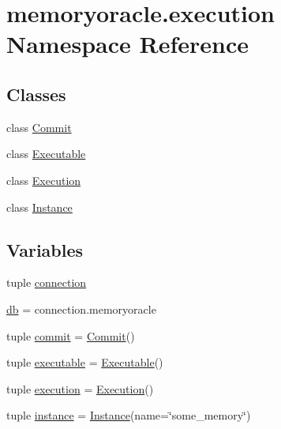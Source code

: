 \hypertarget{namespacememoryoracle_1_1execution}{}\section{memoryoracle.\+execution Namespace Reference}
\label{namespacememoryoracle_1_1execution}
\subsection*{Classes}
\begin{DoxyCompactItemize}
\item 
class \hyperlink{classmemoryoracle_1_1execution_1_1Commit}{Commit}
\item 
class \hyperlink{classmemoryoracle_1_1execution_1_1Executable}{Executable}
\item 
class \hyperlink{classmemoryoracle_1_1execution_1_1Execution}{Execution}
\item 
class \hyperlink{classmemoryoracle_1_1execution_1_1Instance}{Instance}
\end{DoxyCompactItemize}
\subsection*{Variables}
\begin{DoxyCompactItemize}
\item 
tuple \hyperlink{namespacememoryoracle_1_1execution_a784a8c4d93752cd7436bde333f52572f}{connection}
\item 
\hyperlink{namespacememoryoracle_1_1execution_ad0c5f80d3b0eb57b11ab6ab2a235858f}{db} = connection.\+memoryoracle
\item 
tuple \hyperlink{namespacememoryoracle_1_1execution_a1f4dd92e5fd65b6d5ac5d1631d09cf53}{commit} = \hyperlink{classmemoryoracle_1_1execution_1_1Commit}{Commit}()
\item 
tuple \hyperlink{namespacememoryoracle_1_1execution_a4d764e8579bfe0d25924dfb6adcdd2ee}{executable} = \hyperlink{classmemoryoracle_1_1execution_1_1Executable}{Executable}()
\item 
tuple \hyperlink{namespacememoryoracle_1_1execution_af8598b45538c92785bbdcd27f9c5fdd5}{execution} = \hyperlink{classmemoryoracle_1_1execution_1_1Execution}{Execution}()
\item 
tuple \hyperlink{namespacememoryoracle_1_1execution_a53a733d87e07c06eaa39fd870dc12cc7}{instance} = \hyperlink{classmemoryoracle_1_1execution_1_1Instance}{Instance}(name=\char`\"{}some\+\_\+memory\char`\"{})
\end{DoxyCompactItemize}


